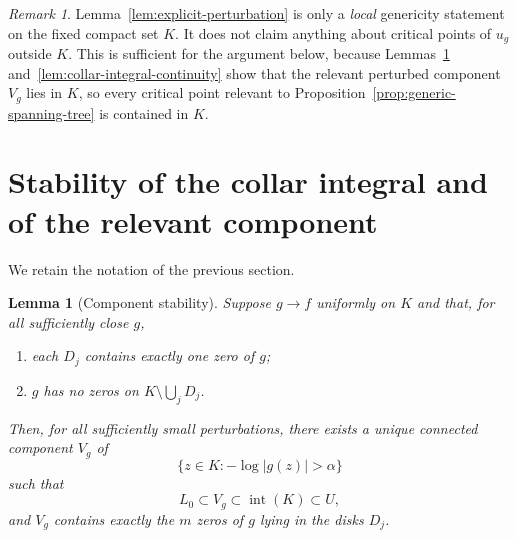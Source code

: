 \documentclass[12pt]{amsart}
\theoremstyle{definition}
\newtheorem{lemma}[theorem]{Lemma}
\theoremstyle{remark}
\newtheorem*{remarkplain}{Remark}
\begin{document}
\begin{remarkplain}
Lemma~\ref{lem:explicit-perturbation} is only a \emph{local} genericity statement on the fixed compact set $K$. It does not claim anything about critical points of $u_g$ outside $K$. This is sufficient for the argument below, because Lemmas~\ref{lem:component-stability} and~\ref{lem:collar-integral-continuity} show that the relevant perturbed component $V_g$ lies in $K$, so every critical point relevant to Proposition~\ref{prop:generic-spanning-tree} is contained in $K$.
\end{remarkplain}



\section{Stability of the collar integral and of the relevant component}

We retain the notation of the previous section.

\medskip
\begin{lemma}[Component stability]\label{lem:component-stability}
\emph{Suppose $g\to f$ uniformly on $K$ and that, for all sufficiently
close $g$,}
\begin{enumerate}
\item[(a)] \emph{each $D_j$ contains exactly one zero of $g$;}
\item[(b)] \emph{$g$ has no zeros on $K\setminus \bigcup_j D_j$.}
\end{enumerate}
\emph{Then, for all sufficiently small perturbations, there exists a unique connected component $V_g$ of
\[
\{z\in K:-\log|g(z)|>\alpha\}
\]
such that
\[
L_0\subset V_g\subset \operatorname{int}(K)\subset U,
\]
and $V_g$ contains exactly the $m$ zeros of $g$ lying in the disks $D_j$.}
\end{lemma}
\end{document}
